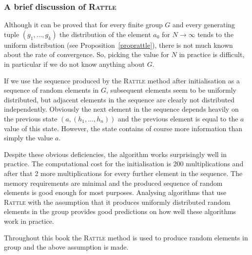 \subsubsection{A brief discussion of \textsc{Rattle}}

%
Although it can be proved that for every finite group $G$ and every
generating tuple $(g_1, \ldots, g_k)$ the distribution of the element
$a_0$ for $N \to \infty$ tends to the uniform distribution (see
Proposition~\ref{proprattle}), there is
not much known about the rate of convergence. So, picking the value for
$N$ in practice is difficult, in particular if we do not know anything
about $G$.

If we use the sequence produced by the \textsc{Rattle} method
after initialisation as a sequence of random elements in $G$, 
subsequent elements seem to be uniformly distributed, but adjacent
elements in the sequence are clearly not distributed independently.
Obviously the next element in the sequence depends heavily on the
previous state $(a,(h_1,\ldots,h_n))$ and the previous element is
equal to the $a$ value of this state. However, the state contains of
course more information than simply the value $a$.

Despite these obvious deficiencies, the algorithm
works surprisingly well in practice. The computational cost for the 
initialisation is 200 multiplications and after that 2 more
multiplications for every further element in the sequence.
The memory requirements are minimal and the produced sequence of
random elements is good enough for most purposes. Analysing algorithms
that use \textsc{Rattle}
%
with the assumption that it produces uniformly distributed random
elements in the group provides good predictions on how
well these algorithms work in practice.

Throughout this book the \textsc{Rattle} method is used to produce
random elements in group and the above assumption is made.
%

